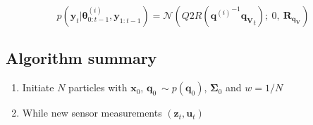 \documentclass[]{article}
\providecommand{\tightlist}{%
  \setlength{\itemsep}{0pt}\setlength{\parskip}{0pt}}
\begin{document}
\[p(\mathbf{y}_t | \boldsymbol{\theta}^{(i)}_{0:t-1}, \mathbf{y}_{1:t-1}) = \mathcal{N}(Q2R({\mathbf{q}^{(i)}}^{-1}\mathbf{q_V}_t);~ 0 ,~ \mathbf{R}_{\mathbf{q_V}})\]

\subsection{Algorithm summary}\label{algorithm-summary}

\begin{enumerate}
\def\labelenumi{\arabic{enumi}.}
\tightlist
\item
  Initiate \(N\) particles with \(\mathbf{x}_0\),
  \(\mathbf{q}_0 ~ \sim p(\mathbf{q}_0)\), \(\mathbf{\Sigma}_0\) and
  \(w = 1/N\)
\item
  While new sensor measurements \((\mathbf{z}_t, \mathbf{u}_t)\)
\end{enumerate}
\end{document}
